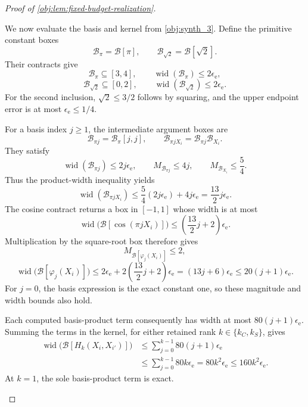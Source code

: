 \begin{proof}[Proof of \cref{obj:lem:fixed-budget-realization}]
\begin{enumerate}
We now evaluate the basis and kernel from \cref{obj:synth_3}. Define the primitive constant boxes
\[
\mathcal B_\pi=\mathcal B[\pi],
\qquad
\mathcal B_{\sqrt2}=\mathcal B[\sqrt2].
\]
Their contracts give
\[
\mathcal B_\pi\subseteq[3,4],
\qquad
\operatorname{wid}(\mathcal B_\pi)\le2\epsilon_{\mathrm e},
\]
\[
\mathcal B_{\sqrt2}\subseteq[0,2],
\qquad
\operatorname{wid}(\mathcal B_{\sqrt2})\le2\epsilon_{\mathrm e}.
\]
For the second inclusion, \(\sqrt2\le3/2\) follows by squaring, and the upper endpoint error is at most \(\epsilon_{\mathrm e}\le1/4\).

For a basis index \(j\ge1\), the intermediate argument boxes are
\[
\mathcal B_{\pi j}=\mathcal B_\pi[j,j],
\qquad
\mathcal B_{\pi jX_i}=\mathcal B_{\pi j}\mathcal B_{X_i}.
\]
They satisfy
\[
\operatorname{wid}(\mathcal B_{\pi j})\le2j\epsilon_{\mathrm e},
\qquad
M_{\mathcal B_{\pi j}}\le4j,
\qquad
M_{\mathcal B_{X_i}}\le\frac54.
\]
Thus the product-width inequality yields
\[
\operatorname{wid}(\mathcal B_{\pi jX_i})
\le
\frac54(2j\epsilon_{\mathrm e})+4j\epsilon_{\mathrm e}
=\frac{13}{2}j\epsilon_{\mathrm e}.
\]
The cosine contract returns a box in \([-1,1]\) whose width is at most
\[
\operatorname{wid}\bigl(\mathcal B[\cos(\pi jX_i)]\bigr)
\le\left(\frac{13}{2}j+2\right)\epsilon_{\mathrm e}.
\]
Multiplication by the square-root box therefore gives
\[
M_{\mathcal B[\varphi_j(X_i)]}\le2,
\]
\[
\operatorname{wid}\bigl(\mathcal B[\varphi_j(X_i)]\bigr)
\le
2\epsilon_{\mathrm e}
+2\left(\frac{13}{2}j+2\right)\epsilon_{\mathrm e}
=(13j+6)\epsilon_{\mathrm e}
\le20(j+1)\epsilon_{\mathrm e}.
\]
For \(j=0\), the basis expression is the exact constant one, so these magnitude and width bounds also hold.

Each computed basis-product term consequently has width at most
\(80(j+1)\epsilon_{\mathrm e}\). Summing the terms in the kernel, for either retained rank \(k\in\{k_C,k_S\}\), gives
\[
\begin{aligned}
\operatorname{wid}\bigl(\mathcal B[H_k(X_i,X_{i'})]\bigr)
&\le\sum_{j=0}^{k-1}80(j+1)\epsilon_{\mathrm e}\\
&\le\sum_{j=0}^{k-1}80k\epsilon_{\mathrm e}
=80k^2\epsilon_{\mathrm e}
\le160k^2\epsilon_{\mathrm e}.
\end{aligned}
\]
At \(k=1\), the sole basis-product term is exact.


\end{enumerate}
\end{proof}
